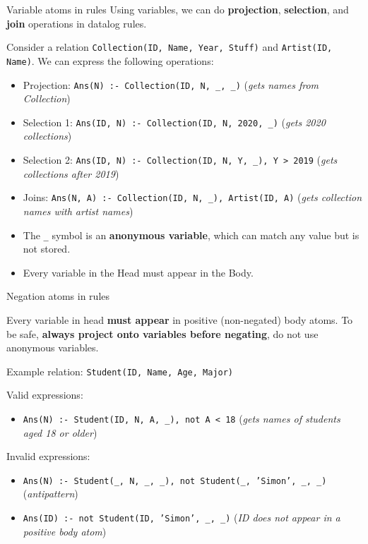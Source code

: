 \begin{theorem}
    {Variable atoms in rules}
    Using variables, we can do \textbf{projection}, \textbf{selection}, and \textbf{join} operations in datalog rules.

    Consider a relation \texttt{Collection(ID, Name, Year, Stuff)} and \texttt{Artist(ID, Name)}. We can express the following operations:
    \begin{itemize}
        \item Projection: \texttt{Ans(N) :- Collection(ID, N, \_, \_)} (\textit{gets names from Collection})
        \item Selection 1: \texttt{Ans(ID, N) :- Collection(ID, N, 2020, \_)} (\textit{gets 2020 collections})
        \item Selection 2: \texttt{Ans(ID, N) :- Collection(ID, N, Y, \_), Y > 2019} (\textit{gets collections after 2019})
        \item Joins: \texttt{Ans(N, A) :- Collection(ID, N, \_), Artist(ID, A)} (\textit{gets collection names with artist names})
    \end{itemize}

    \begin{itemize}
        \item The \texttt{\_} symbol is an \textbf{anonymous variable}, which can match any value but is not stored.
        \item Every variable in the Head must appear in the Body.
    \end{itemize}
\end{theorem}

\begin{definition}
    {Negation atoms in rules}

    Every variable in head \textbf{must appear} in positive (non-negated) body atoms. To be safe, \textbf{always project onto variables before negating}, do not use anonymous variables.

    Example relation: \texttt{Student(ID, Name, Age, Major)}

    Valid expressions:
    \begin{itemize}
        \item \texttt{Ans(N) :- Student(ID, N, A, \_), not A < 18} (\textit{gets names of students aged 18 or older})
    \end{itemize}
    Invalid expressions:
    \begin{itemize}
        \item \texttt{Ans(N) :- Student(\_, N, \_, \_), not Student(\_, 'Simon', \_, \_)} (\textit{antipattern})
        \item \texttt{Ans(ID) :- not Student(ID, 'Simon', \_, \_)} (\textit{ID does not appear in a positive body atom})
    \end{itemize}
\end{definition}

